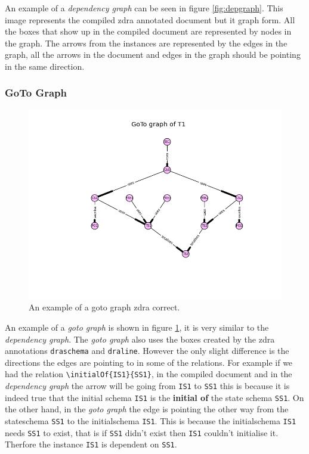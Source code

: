 An example of a \emph{dependency graph} can be seen in figure \ref{fig:depgraph}. This image represents the compiled \gls{zdra} annotated document but it graph form. All the boxes that show up in the compiled document are represented by nodes in the graph. The arrows from the instances are represented by the edges in the graph, all the arrows in the document and edges in the graph should be pointing in the same direction.


\subsubsection{GoTo Graph}

\begin{figure}[H]
\centering
\includegraphics[scale=0.6]{Figures/zdra/gotograph.png}
\caption{An example of a goto graph \gls{zdra} correct. \label{fig:gotograph}}
\end{figure}

An example of a \emph{goto graph} is shown in figure \ref{fig:gotograph}, it is very similar to the \emph{dependency graph}. The \emph{goto graph} also uses the boxes created by the \gls{zdra} annotations \verb|draschema| and \verb|draline|. However the only slight difference is the directions the edges are pointing to in some of the relations. For example if we had the relation \verb|\initialOf{IS1}{SS1}|, in the compiled document and in the \emph{dependency graph} the arrow will be going from \verb|IS1| to \verb|SS1| this is because it is indeed true that the initial schema \verb|IS1| is the \textbf{initial of} the state schema \verb|SS1|. On the other hand, in the \emph{goto graph} the edge is pointing the other way from the stateschema \verb|SS1| to the initialschema \verb|IS1|. This is because the initialschema \verb|IS1| needs \verb|SS1| to exist, that is if \verb|SS1| didn't exist then \verb|IS1| couldn't initialise it. Therfore the instance \verb|IS1| is dependent on \verb|SS1|.

